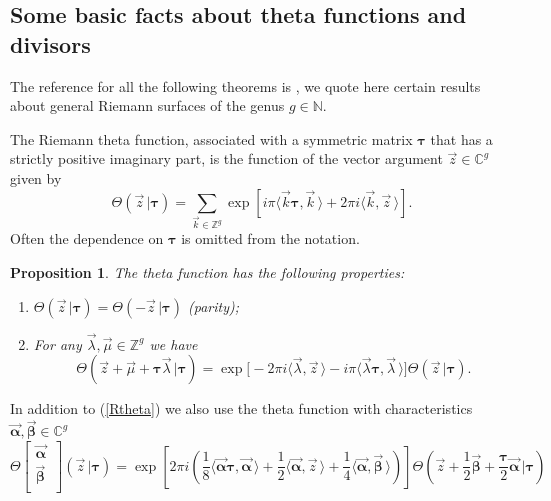 \documentclass[10pt,oneside,reqno]{amsart}
\numberwithin{equation}{section}
\newtheorem{proposition}[theorem]{Proposition}
\def\le{\left}
\def\ri{\right}
\def\bp{\begin{proposition}}
\def\ep{\end{proposition}}
\def\be{\begin{equation}}
\def\ee{\end{equation}}
\def\C{{\mathbb C}}
\def\N{{\mathbb N}}
\def\Z{{\mathbb Z}}
\def\eqref#1{(\ref{#1})}
\begin{document}
\begin{appendix}
\section{Some basic facts about theta functions and divisors}\label{app2}
The reference for all the following theorems is \cite{FK}, we quote here certain results about general Riemann surfaces of the genus $g\in \N$.\bigskip

The Riemann theta function, associated with a symmetric matrix ${\boldsymbol \tau}$ that has a strictly positive imaginary part,  
is the function of the vector argument $\vec z\in\C^g$ given by
\be\label{Rtheta}
\Theta(\vec z\,|{\boldsymbol \tau})= \sum_{\vec k\in \Z^g} \exp\left[i\pi \langle\vec{k}{\boldsymbol \tau},\vec{k}\,\rangle +2\pi i \langle\vec{k},\vec{z}\,\rangle\right].
\ee
Often the dependence on ${\boldsymbol \tau}$ is  omitted from the notation.
\bp
\label{thetaproperties}
The theta function has the following properties:
\begin{enumerate}
\item $\Theta(\vec z\,|{\boldsymbol \tau})  = \Theta(-\vec z\,|{\boldsymbol \tau})$ (parity);
\item For any $\vec{\lambda},\vec{\mu}\in \Z^g$ we have
\be
\Theta(\vec z + \vec{\mu} + {\boldsymbol \tau}\vec{\lambda}\,|{\boldsymbol \tau}) = \exp\Big[ -2\pi i \langle\vec{\lambda},\vec z\,\rangle - i\pi\langle  \vec{\lambda} {\boldsymbol \tau},\vec{\lambda}\,\rangle 
\Big]
\Theta(\vec z\,|{\boldsymbol \tau}).\label{thetaperiods}
\ee
\end{enumerate}
\ep
In addition to \eqref{Rtheta} we also use the theta function with characteristics $\vec{\boldsymbol \alpha},\vec{\boldsymbol \beta}\in\mathbb{C}^g$
\begin{equation}\label{cRtheta}
 \Theta\begin{bmatrix}
        \vec{\boldsymbol \alpha}\,\\
\vec{\boldsymbol \beta}\,\\
       \end{bmatrix}
(\vec z\,|{\boldsymbol \tau})= \exp \le[ 2\pi i \le(
\frac 1 8 \langle\vec{\boldsymbol \alpha}{\boldsymbol \tau},\vec{\boldsymbol \alpha}\,\rangle + \frac 1 2 \langle\vec{\boldsymbol \alpha},\vec{z}\,\rangle + \frac 1 4 \langle\vec{\boldsymbol \alpha},\vec{\boldsymbol \beta}\,\rangle
\ri)\ri] \Theta \le( \vec{z} + \frac 1 2 \vec{\boldsymbol \beta} + \frac {\boldsymbol \tau} 2 \vec{\boldsymbol \alpha}\,\bigg|{\boldsymbol \tau} \ri)
\end{equation}


\end{appendix}
\end{document}
